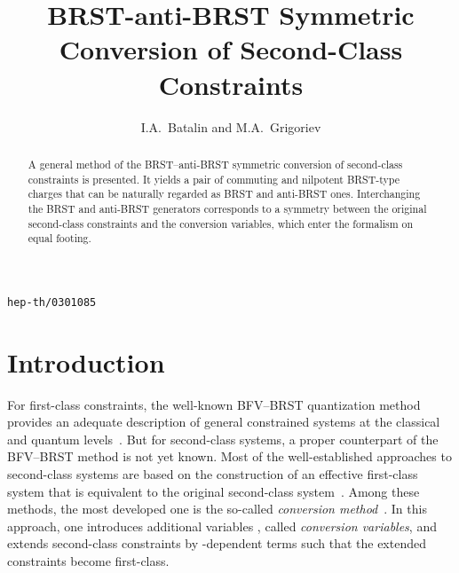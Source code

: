 \documentclass[a4paper,12pt]{amsart}
\numberwithin{equation}{section}
\begin{document}
\addtolength{\baselineskip}{2.2pt}

{\hfill{\lowercase{\tt hep-th/0301085}}\\[12pt]}

\title{BRST-anti-BRST Symmetric Conversion of Second-Class Constraints}

\author{I.A.~Batalin and M.A.~Grigoriev} \address{Lebedev Physics
  Institute, RAS, Leninskiy 53, Moscow 117924, Russia}


\begin{abstract}
  A general method of the BRST--anti-BRST symmetric conversion of
  second-class constraints is presented.  It yields a pair of
  commuting and nilpotent BRST-type charges that can be naturally
  regarded as BRST and anti-BRST ones.  Interchanging the BRST and
  anti-BRST generators corresponds to a symmetry between the original
  second-class constraints and the conversion variables, which
  enter the formalism on equal footing.
\end{abstract}
\maketitle







\vspace{0.7cm}

\thispagestyle{empty}

\section{Introduction}
For first-class constraints, the well-known BFV--BRST quantization
method provides an adequate description of general constrained systems
at the classical and quantum levels~\cite{BFV}.  But for second-class
systems, a proper counterpart of the BFV--BRST method is not yet
known.  Most of the well-established approaches to second-class
systems are based on the construction of an effective first-class
system that is equivalent to the original second-class
system~\cite{FSh,BF,BF87, Split,BMgauge}.  Among these methods, the
most developed one is the so-called \textit{conversion
  method}~\cite{FSh,BF,BF87,BT,BGL}.  In this approach, one introduces
additional variables \myHighlight{$\phi$}\coordHE{}, called \textit{conversion variables}, and
extends second-class constraints by \myHighlight{$\phi$}\coordHE{}-dependent terms such that
the extended constraints become first-class.
\end{document}
